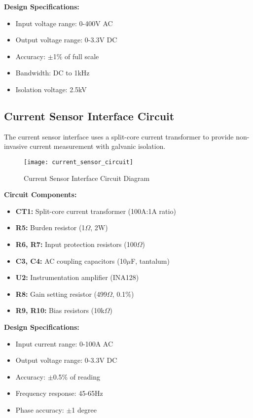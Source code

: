 \textbf{Design Specifications:}
\begin{itemize}
\item Input voltage range: 0-400V AC
\item Output voltage range: 0-3.3V DC
\item Accuracy: $\pm$1\% of full scale
\item Bandwidth: DC to 1kHz
\item Isolation voltage: 2.5kV
\end{itemize}

\subsection{Current Sensor Interface Circuit}
\label{subsec:current_sensor_circuit}

The current sensor interface uses a split-core current transformer to provide non-invasive current measurement with galvanic isolation.

\begin{figure}[H]
\centering
\texttt{[image: current\_sensor\_circuit]}
\caption{Current Sensor Interface Circuit Diagram}
\label{fig:current_sensor_circuit}
\end{figure}

\textbf{Circuit Components:}
\begin{itemize}
\item \textbf{CT1:} Split-core current transformer (100A:1A ratio)
\item \textbf{R5:} Burden resistor (1$\Omega$, 2W)
\item \textbf{R6, R7:} Input protection resistors (100$\Omega$)
\item \textbf{C3, C4:} AC coupling capacitors (10$\mu$F, tantalum)
\item \textbf{U2:} Instrumentation amplifier (INA128)
\item \textbf{R8:} Gain setting resistor (499$\Omega$, 0.1\%)
\item \textbf{R9, R10:} Bias resistors (10k$\Omega$)
\end{itemize}

\textbf{Design Specifications:}
\begin{itemize}
\item Input current range: 0-100A AC
\item Output voltage range: 0-3.3V DC
\item Accuracy: $\pm$0.5\% of reading
\item Frequency response: 45-65Hz
\item Phase accuracy: $\pm$1 degree
\end{itemize}

